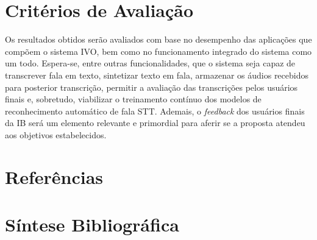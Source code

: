 \documentclass[
	12pt,				%
	a4paper,			%
	english,			%
	brazil,				%
	]{article}
\begin{document}
\section{Critérios de Avaliação} 
     
Os resultados obtidos serão avaliados com base no desempenho das aplicações que compõem o sistema IVO, bem como no funcionamento integrado do sistema como um todo. Espera-se, entre outras funcionalidades, que o sistema seja capaz de transcrever fala em texto, sintetizar texto em fala, armazenar os áudios recebidos para posterior transcrição, permitir a avaliação das transcrições pelos usuários finais e, sobretudo, viabilizar o treinamento contínuo dos modelos de reconhecimento automático de fala STT. Ademais, o \textit{feedback} dos usuários finais da IB será um elemento relevante e primordial para aferir se a proposta atendeu aos objetivos estabelecidos.

\newpage
\renewcommand\refname{}
\section{Referências}

    \vspace{-4.3em}
    
    
\section{Síntese Bibliográfica}

    \vspace{-3.5em}
    
 
\end{document}
